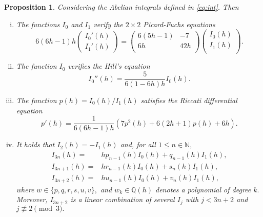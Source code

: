 \documentclass[12pt,a4paper,reqno]{amsart}
\newcommand{\N}{\mathbb{N}}
\newtheorem{prop}[teo]{Proposition}
\begin{document}
\begin{prop}\label{pr:pf}  Considering the  Abelian integrals defined in
        \eqref{eq:int}. Then
        \begin{enumerate}[(i)]
\item  The functions $I_0$ and $I_1$ verify the  $2\times2$ Picard-Fuchs
equations
\begin{equation}\label{eq:pf}
6(6h-1)h \left(\begin{array}{c}
 I_0'(h)  \\
I_1'(h)
\end{array}\right)=\left(
\begin{array}{cc}
6(5h-1) & -7\\
6h & 42h\\
\end{array}
\right)\left(
         \begin{array}{c}
           I_0(h)\\
           I_1(h)\\
         \end{array}
       \right).
\end{equation}

\item The function $I_0$ verifies the Hill's equation
\begin{equation*}
I_0''(h)=\frac5{6(1-6h)h} I_0(h).
\end{equation*}

\item The function $p(h)=I_0(h)/I_1(h)$ satisfies the Riccati
differential equation
\begin{equation*}
p'(h)=\frac1{6(6h-1)h}\left(7p^2(h)+6(2h+1)p(h)+6h\right).
\end{equation*}


\item It holds that $I_2(h)=-I_1(h)$ and, for all $1\le n\in\N,$
\begin{align*}
I_{3n}(h)=&h p_{n-1}(h)I_0(h)+q_{n-1}(h) I_1(h),\\
I_{3n+1}(h)=&h r_{n-1}(h)I_0(h)+s_{n}(h) I_1(h),\\
I_{3n+2}(h)=&h u_{n-1}(h)I_0(h)+v_{n}(h) I_1(h),
\end{align*}
where $w\in\{p,q,r,s,u,v\},$ and $w_k\in\mathbb{Q}(h)$ denotes a
polynomial of degree $k.$ Moreover, $I_{3n+2}$ is a linear
combination of several $I_j$ with $j<3n+2$  and $j\not\equiv2 \pmod
3.$
\end{enumerate}
\end{prop}
\end{document}

